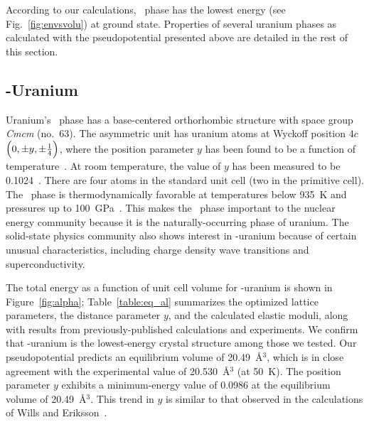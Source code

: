 According to our calculations, \textalpha~phase has the lowest energy (see Fig.~\ref{fig:envsvolu}) at ground state. Properties of several uranium phases as calculated with the pseudopotential
presented above are detailed in the rest of this section.


\subsection{\boldmath \textalpha-Uranium} \label{subsec_alphaU}
Uranium's \textalpha\ phase has a base-centered orthorhombic structure with
space group \textit{Cmcm} (no.~63). The asymmetric unit has uranium atoms at
Wyckoff position $4c$ $\Bigl(0, \pm y, \pm\frac{1}{4}\Bigr)$, where the
position parameter $y$ has been found to be a function of
temperature~\cite{barrett1963crystal}.
At room temperature, the value of $y$ has been measured to be
0.1024~\cite{barrett1963crystal,lander1994solid}. There are four atoms in the
standard unit cell (two in the primitive cell).
The \textalpha\ phase is thermodynamically favorable at temperatures below
935~K and pressures up to 100~GPa~\cite{le2003structural,akella1997structural}.
This makes the \textalpha\ phase important to the nuclear energy community
because it is the naturally-occurring phase of uranium. The solid-state physics
community also shows interest in \textalpha-uranium because of certain unusual
characteristics, including charge density wave transitions and
superconductivity.

The total energy as a function of unit cell volume for \textalpha-uranium is
shown in Figure~\ref{fig:alpha}; Table~\ref{table:eq_al} summarizes the
optimized lattice parameters, the distance parameter $y$, and the calculated
elastic moduli, along with results from previously-published calculations
and experiments. We confirm that \textalpha-uranium is the lowest-energy crystal
structure among those we tested. Our pseudopotential predicts an equilibrium
volume of 20.49~\AA$^3$, which is in close agreement with the experimental
value of 20.530~\AA$^3$ (at 50~K)\@. The position parameter $y$ exhibits a
minimum-energy 
value of 0.0986 at the equilibrium volume of 20.49~\AA$^3$.
This trend in $y$ is similar to that observed in the calculations of
Wills and Eriksson~\cite{wills1992crystal}.

